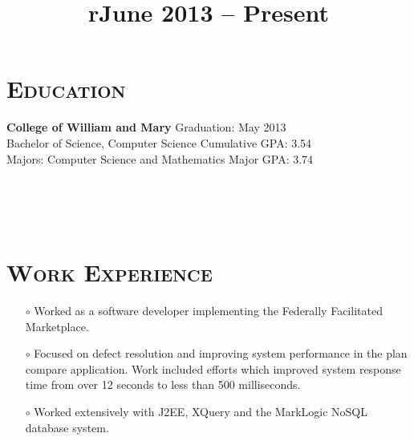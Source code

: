 \begin{resume}



\section{\textsc{Education}}

\textbf{College of William and Mary} \hfill Graduation: May 2013 \\
Bachelor of Science, Computer Science \hfill Cumulative GPA: 3.54 \\
Majors: Computer Science and Mathematics \hfill Major GPA: 3.74





\begin{formatb}
  \title{r}\\
  \\
  \body\\
\end{formatb}

\section{\textsc{Work Experience}}

\title{June 2013 -- Present}
\begin{position}
\vspace{-10pt}
\begin{itemize}\setlength{\itemsep}{-0.5mm}
\item[$\circ$] Worked as a software developer implementing the Federally Facilitated Marketplace.
\item[$\circ$] Focused on defect resolution and improving system performance in the plan compare application. Work included efforts which improved system response time from over 12 seconds to less than 500 milliseconds.
\item[$\circ$] Worked extensively with J2EE, XQuery and the MarkLogic NoSQL database system.
\end{itemize}
\end{position}


\end{resume}
